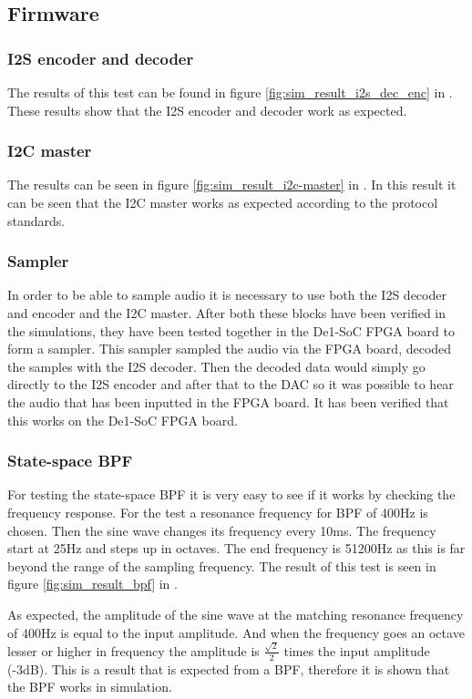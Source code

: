 \subsection{Firmware}
\subsubsection{I2S encoder and decoder}
The results of this test can be found in figure \ref{fig:sim_result_i2s_dec_enc} in . These results show that the I2S encoder and decoder work as expected. 

\subsubsection{I2C master}
The results can be seen in figure \ref{fig:sim_result_i2c-master} in . In this result it can be seen that the I2C master works as expected according to the protocol standards.

\subsubsection{Sampler}
In order to be able to sample audio it is necessary to use both the I2S decoder and encoder and the I2C master. After both these blocks have been verified in the simulations, they have been tested together in the De1-SoC FPGA board to form a sampler. This sampler sampled the audio via the FPGA board, decoded the samples with the I2S decoder. Then the decoded data would simply go directly to the I2S encoder and after that to the DAC so it was possible to hear the audio that has been inputted in the FPGA board. It has been verified that this works on the De1-SoC FPGA board.

\subsubsection{State-space BPF}
For testing the state-space BPF it is very easy to see if it works by checking the frequency response. For the test a resonance frequency for BPF of 400Hz is chosen. Then the sine wave changes its frequency every 10ms. The frequency start at 25Hz and steps up in octaves. The end frequency is 51200Hz as this is far beyond the range of the sampling frequency. The result of this test is seen in figure \ref{fig:sim_result_bpf} in . 

As expected, the amplitude of the sine wave at the matching resonance frequency of 400Hz is equal to the input amplitude. And when the frequency goes an octave lesser or higher in frequency the amplitude is $\frac{\sqrt{2}}{2}$ times the input amplitude (-3dB). This is a result that is expected from a BPF, therefore it is shown that the BPF works in simulation.

